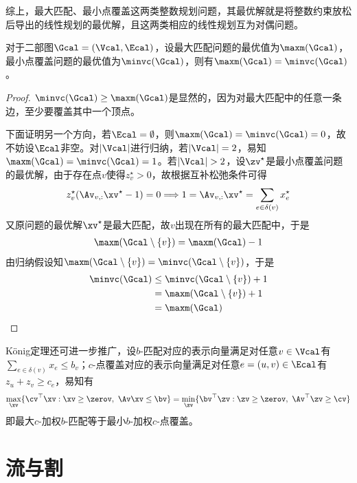 \documentclass{ctexart}
\begin{document}
综上，最大匹配、最小点覆盖这两类整数规划问题，其最优解就是将整数约束放松后导出的线性规划的最优解，且这两类相应的线性规划互为对偶问题。

\begin{theorem} [König]
    对于二部图$\Gcal = (\Vcal, \Ecal)$，设最大匹配问题的最优值为$\maxm(\Gcal)$，最小点覆盖问题的最优值为$\minvc(\Gcal)$，则有$\maxm(\Gcal) = \minvc(\Gcal)$。
\end{theorem}

\begin{proof}
    $\minvc(\Gcal) \ge \maxm(\Gcal)$是显然的，因为对最大匹配中的任意一条边，至少要覆盖其中一个顶点。

    下面证明另一个方向，若$\Ecal = \emptyset$，则$\maxm(\Gcal) = \minvc(\Gcal) = 0$，故不妨设$\Ecal$非空。对$|\Vcal|$进行归纳，若$|\Vcal| = 2$，易知$\maxm(\Gcal) = \minvc(\Gcal) = 1$。若$|\Vcal| > 2$，设$\zv^\star$是最小点覆盖问题的最优解，由于存在点$v$使得$z_v^\star > 0$，故根据互补松弛条件可得
    \begin{align*}
        z_v^\star (\Av_{v,:} \xv^\star - 1) = 0 \Longrightarrow 1 = \Av_{v,:} \xv^\star = \sum_{e \in \delta(v)} x_e^\star
    \end{align*}
    又原问题的最优解$\xv^\star$是最大匹配，故$v$出现在所有的最大匹配中，于是
    \begin{align*}
        \maxm(\Gcal \setminus \{v\}) = \maxm(\Gcal) - 1
    \end{align*}
    由归纳假设知$\maxm(\Gcal \setminus \{v\}) = \minvc(\Gcal \setminus \{v\})$，于是
    \begin{align*}
        \minvc(\Gcal) & \le \minvc(\Gcal \setminus \{v\}) + 1 \\
                      & = \maxm(\Gcal \setminus \{v\}) + 1    \\
                      & = \maxm(\Gcal)
    \end{align*}
\end{proof}

König定理还可进一步推广，设$b$-匹配对应的表示向量满足对任意$v \in \Vcal$有$\sum_{e \in \delta(v)} x_e \le b_v$；$c$-点覆盖对应的表示向量满足对任意$e = (u,v) \in \Ecal$有$z_u + z_v \ge c_e$，易知有
\begin{align*}
    \max_{\xv} \{ \cv^\top \xv : \xv \ge \zerov, ~ \Av \xv \le \bv \} = \min_{\zv} \{ \bv^\top \zv : \zv \ge \zerov, ~ \Av^\top \zv \ge \cv \}
\end{align*}
即最大$c$-加权$b$-匹配等于最小$b$-加权$c$-点覆盖。

\section{流与割}
\end{document}
